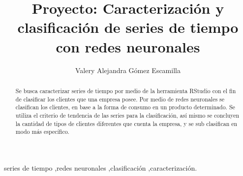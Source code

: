 \documentclass[preprint,12pt]{elsarticle}
\begin{document}
\begin{frontmatter}



\title{Proyecto: Caracterizaci\'on y clasificaci\'on de series de tiempo con redes neuronales}


\author{Valery Alejandra G\'omez Escamilla}

\address{}

\begin{abstract}
Se busca caracterizar series de tiempo por medio de la herramienta RStudio con el fin de clasificar los clientes que una empresa posee. Por medio de redes neuronales se clasifican los clientes, en base a la forma de consumo en un producto determinado. Se utiliza el criterio de tendencia de las series para la clasificación, así mismo se concluyen la cantidad de tipos de clientes diferentes que cuenta la empresa, y se sub clasifican en modo más específico.

\end{abstract}

\begin{keyword}

  series de tiempo \sep redes neuronales \sep clasificaci\'on \sep caracterizaci\'on.



\end{keyword}

\end{frontmatter}
\end{document}
